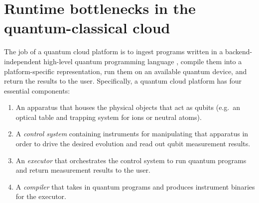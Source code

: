 \documentclass[12pt]{iopart}
\begin{document}
\section{Runtime bottlenecks in the quantum-classical cloud}

The job of a quantum cloud platform is to ingest programs written in a backend-independent high-level quantum programming language \cite{SmithQuil, CrossQASM}, compile them into a platform-specific representation, run them on an available quantum device, and return the results to the user. Specifically, a quantum cloud platform has four essential components:

\begin{enumerate}
    \item An apparatus that houses the physical objects that act as qubits (e.g.\ an optical table and trapping system for ions or neutral atoms).
    \item A \textit{control system} containing instruments for manipulating that apparatus in order to drive the desired evolution and read out qubit measurement results.
    \item An \textit{executor} that orchestrates the control system to run quantum programs and return measurement results to the user.
    \item A \textit{compiler} that takes in quantum programs and produces instrument binaries for the executor.
\end{enumerate}
\end{document}
